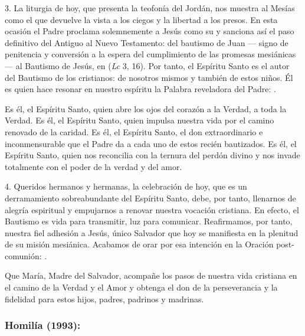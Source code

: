 \begin{body}
					3. La liturgia de hoy, que presenta la teofonía del Jordán, nos muestra al Mesías como el que devuelve la vista a los ciegos y la libertad a los presos. En esta ocasión el Padre proclama solemnemente a Jesús como su  y sanciona así el paso definitivo del Antiguo al Nuevo Testamento: del bautismo de Juan --- signo de penitencia y conversión a la espera del cumplimiento de las promesas mesiánicas --- al Bautismo de Jesús, en  (\emph{Lc} 3, 16). Por tanto, el Espíritu Santo es el autor del Bautismo de los cristianos: de nosotros mismos y también de estos niños. Él es quien hace resonar en nuestro espíritu la Palabra reveladora del Padre: .
					
					Es él, el Espíritu Santo, quien abre los ojos del corazón a la Verdad, a toda la Verdad. Es él, el Espíritu Santo, quien impulsa nuestra vida por el camino renovado de la caridad. Es él, el Espíritu Santo, el don extraordinario e inconmensurable que el Padre da a cada uno de estos recién bautizados. Es él, el Espíritu Santo, quien nos reconcilia con la ternura del perdón divino y nos invade totalmente con el poder de la verdad y del amor.
					
					4. Queridos hermanos y hermanas, la celebración de hoy, que es un derramamiento sobreabundante del Espíritu Santo, debe, por tanto, llenarnos de alegría espiritual y empujarnos a renovar nuestra vocación cristiana. En efecto, el Bautismo es vida para transmitir, luz para comunicar. Reafirmamos, por tanto, nuestra fiel adhesión a Jesús, único Salvador que hoy se manifiesta en la plenitud de su misión mesiánica. Acabamos de orar por esa intención en la Oración post-comunión: .
					
					Que María, Madre del Salvador, acompañe los pasos de nuestra vida cristiana en el camino de la Verdad y el Amor y obtenga el don de la perseverancia y la fidelidad para estos hijos, padres, padrinos y madrinas.
				\end{body}
			
			\subsubsection{Homilía (1993):}
			
				
